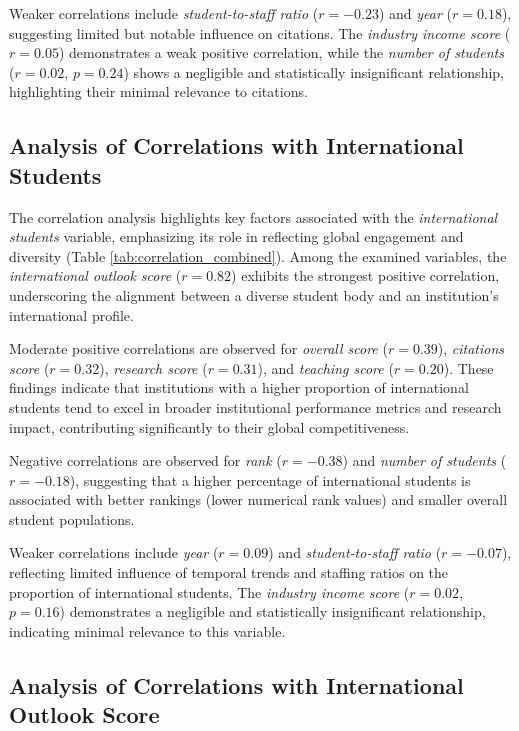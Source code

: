 \documentclass[conference]{IEEEtran}
\begin{document}
Weaker correlations include \textit{student-to-staff ratio} ($r = -0.23$) and \textit{year} ($r = 0.18$), suggesting limited but notable influence on citations. The \textit{industry income score} ($r = 0.05$) demonstrates a weak positive correlation, while the \textit{number of students} ($r = 0.02$, $p = 0.24$) shows a negligible and statistically insignificant relationship, highlighting their minimal relevance to citations.



\subsection{Analysis of Correlations with International Students}

The correlation analysis highlights key factors associated with the \textit{international students} variable, emphasizing its role in reflecting global engagement and diversity (Table \ref{tab:correlation_combined}). Among the examined variables, the \textit{international outlook score} ($r = 0.82$) exhibits the strongest positive correlation, underscoring the alignment between a diverse student body and an institution's international profile.

Moderate positive correlations are observed for \textit{overall score} ($r = 0.39$), \textit{citations score} ($r = 0.32$), \textit{research score} ($r = 0.31$), and \textit{teaching score} ($r = 0.20$). These findings indicate that institutions with a higher proportion of international students tend to excel in broader institutional performance metrics and research impact, contributing significantly to their global competitiveness.

Negative correlations are observed for \textit{rank} ($r = -0.38$) and \textit{number of students} ($r = -0.18$), suggesting that a higher percentage of international students is associated with better rankings (lower numerical rank values) and smaller overall student populations. 

Weaker correlations include \textit{year} ($r = 0.09$) and \textit{student-to-staff ratio} ($r = -0.07$), reflecting limited influence of temporal trends and staffing ratios on the proportion of international students. The \textit{industry income score} ($r = 0.02$, $p = 0.16$) demonstrates a negligible and statistically insignificant relationship, indicating minimal relevance to this variable.




\subsection{Analysis of Correlations with International Outlook Score}
\end{document}
